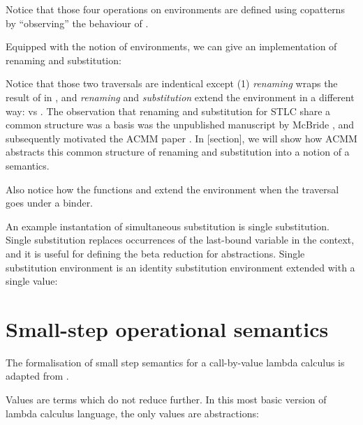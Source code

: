 \documentclass[bsc,frontabs,oneside,singlespacing,parskip,deptreport]{infthesis}
\theoremstyle{definition}
\theoremstyle{lemma}
\begin{document}

Notice that those four operations on environments are defined using
copatterns \cite{DBLP:conf/popl/AbelPTS13} by ``observing'' the
behaviour of .

Equipped with the notion of environments, we can give an
implementation of renaming and substitution:


Notice that those two traversals are indentical except (1)
\textit{renaming} wraps the result of  in , and
\textit{renaming} and \textit{substitution} extend the environment in
a different way:  vs . The observation that renaming and substitution for STLC share a
common structure was a basis was the unpublished manuscript by McBride
\cite{mcbride2005type}, and subsequently motivated the ACMM paper
\cite{DBLP:conf/cpp/Allais0MM17}. In [section], we will show how ACMM
abstracts this common structure of renaming and substitution into a
notion of a semantics.

Also notice how the functions  and  extend the
environment when the traversal goes under a binder.

An example instantation of simultaneous substitution is single
substitution. Single substitution replaces occurrences of the
last-bound variable in the context, and it is useful for defining the
beta reduction for abstractions. Single substitution environment is an
identity substitution environment extended with a single value:



\section{Small-step operational semantics}

The formalisation of small step semantics for a call-by-value lambda
calculus is adapted from \cite{DBLP:conf/sbmf/Wadler18}.

Values are terms which do not reduce further. In this most basic
version of lambda calculus language, the only values are abstractions:

\end{document}

